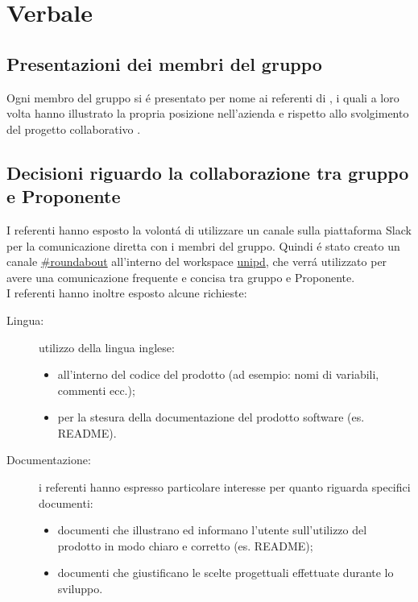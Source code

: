 \section{Verbale}
\subsection{Presentazioni dei membri del gruppo \Gruppo}
Ogni membro del gruppo \Gruppo{} si é presentato per nome ai referenti di \Proponente{}, i quali a loro volta hanno illustrato la propria posizione nell'azienda e rispetto allo svolgimento del progetto collaborativo \NomeProgetto{}.

\subsection{Decisioni riguardo la collaborazione tra gruppo e Proponente}
I referenti hanno esposto la volontá di utilizzare un canale sulla piattaforma %
Slack per la comunicazione diretta con i membri del gruppo. Quindi é stato creato un canale \href{https://app.slack.com/client/T38RC2RNJ/C010A7JDJBH}{\#roundabout} all'interno del workspace \href{https://unipd-math.slack.com}{unipd}, che verrá utilizzato per avere una comunicazione frequente e concisa tra gruppo e Proponente.\\
I referenti hanno inoltre esposto alcune richieste:
\begin{description}
	\item[Lingua:] utilizzo della lingua inglese:
		\begin{itemize}
			\item all'interno del codice del prodotto (ad esempio: nomi di variabili, commenti ecc.);
			\item per la stesura della documentazione del prodotto software (es. README).
		\end{itemize}
	\item[Documentazione:] i referenti hanno espresso particolare interesse per quanto riguarda specifici documenti:
		\begin{itemize}
			\item documenti che illustrano ed informano l'utente sull'utilizzo del prodotto in modo chiaro e corretto (es. README);
			\item documenti che giustificano le scelte progettuali effettuate durante lo sviluppo.
		\end{itemize}
\end{description}


